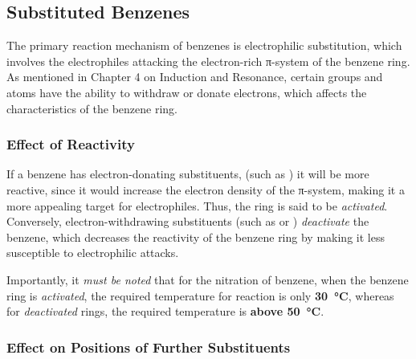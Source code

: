 			\vspace{2.0em}




	\pagebreak
	\subsection{Substituted Benzenes}

		The primary reaction mechanism of benzenes is electrophilic substitution, which involves the electrophiles attacking the
		electron-rich π-system of the benzene ring. As mentioned in Chapter 4 on Induction and Resonance, certain groups and atoms
		have the ability to withdraw or donate electrons, which affects the characteristics of the benzene ring.


		\subsubsection{Effect of Reactivity}

			If a benzene has electron-donating substituents, (such as ) it will be more reactive, since it would increase
			the electron density of the π-system, making it a more appealing target for electrophiles. Thus, the ring is said to
			be \textit{activated}. Conversely, electron-withdrawing substituents (such as  or ) \textit{deactivate}
			the benzene, which decreases the reactivity of the benzene ring by making it less susceptible to electrophilic attacks.


			Importantly, it \textit{must be noted} that for the nitration of benzene, when the benzene ring is \textit{activated}, the
			required temperature for reaction is only \textbf{\SI{30}{\celsius}}, whereas for \textit{deactivated} rings, the required
			temperature is \textbf{above \SI{50}{\celsius}}.


		\subsubsection{Effect on Positions of Further Substituents}

